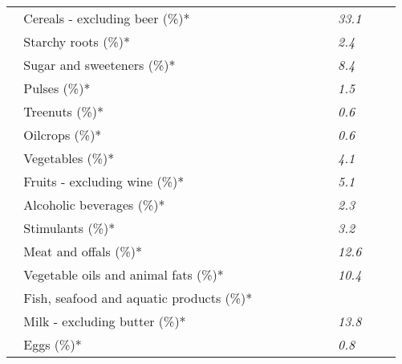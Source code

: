 \begin{tabular}{L{3.9cm} R{1cm} R{1cm} R{1cm}}
	 ~ Cereals - excluding beer (\%)* &  ~ \ \ &  ~ \ \ & \textit{33.1} ~ \ \ \\ 
	 ~ Starchy roots (\%)* &  ~ \ \ &  ~ \ \ & \textit{2.4} ~ \ \ \\ 
	 ~ Sugar and sweeteners (\%)* &  ~ \ \ &  ~ \ \ & \textit{8.4} ~ \ \ \\ 
	 ~ Pulses (\%)* &  ~ \ \ &  ~ \ \ & \textit{1.5} ~ \ \ \\ 
	 ~ Treenuts (\%)* &  ~ \ \ &  ~ \ \ & \textit{0.6} ~ \ \ \\ 
	 ~ Oilcrops (\%)* &  ~ \ \ &  ~ \ \ & \textit{0.6} ~ \ \ \\ 
	 ~ Vegetables (\%)* &  ~ \ \ &  ~ \ \ & \textit{4.1} ~ \ \ \\ 
	 ~ Fruits - excluding wine (\%)* &  ~ \ \ &  ~ \ \ & \textit{5.1} ~ \ \ \\ 
	 ~ Alcoholic beverages (\%)* &  ~ \ \ &  ~ \ \ & \textit{2.3} ~ \ \ \\ 
	 ~ Stimulants (\%)* &  ~ \ \ &  ~ \ \ & \textit{3.2} ~ \ \ \\ 
	 ~ Meat and offals (\%)* &  ~ \ \ &  ~ \ \ & \textit{12.6} ~ \ \ \\ 
	 ~ Vegetable oils and animal fats (\%)* &  ~ \ \ &  ~ \ \ & \textit{10.4} ~ \ \ \\ 
	 ~ Fish, seafood and aquatic products (\%)* &  ~ \ \ &  ~ \ \ &  ~ \ \ \\ 
	 ~ Milk - excluding butter (\%)* &  ~ \ \ &  ~ \ \ & \textit{13.8} ~ \ \ \\ 
	 ~ Eggs (\%)* &  ~ \ \ &  ~ \ \ & \textit{0.8} ~ \ \ \\ 
       \toprule
      \end{tabular}
      \clearpage
{}
